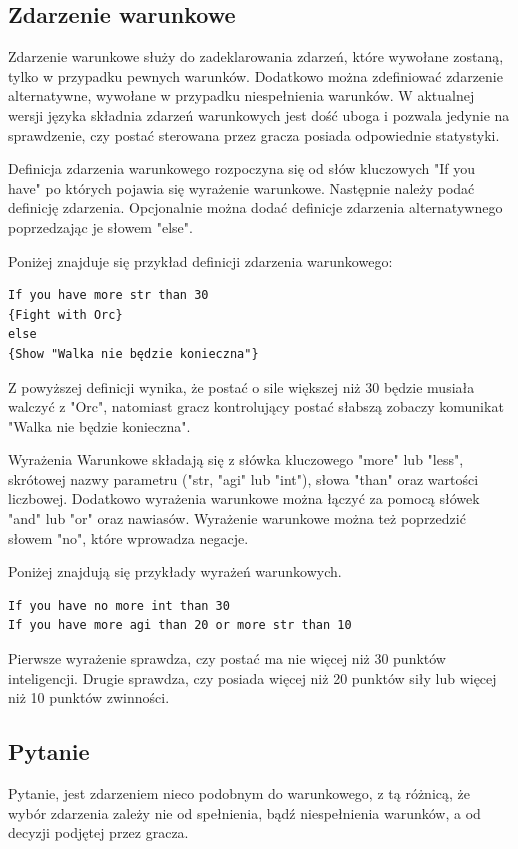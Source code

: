 \documentclass	{xmgr}
\begin{document}
\subsection*{Zdarzenie warunkowe}
Zdarzenie warunkowe służy do zadeklarowania zdarzeń, które wywołane zostaną, tylko w przypadku pewnych warunków. Dodatkowo można zdefiniować zdarzenie alternatywne, wywołane w przypadku niespełnienia warunków.
W aktualnej wersji języka składnia zdarzeń warunkowych jest dość uboga i pozwala jedynie na sprawdzenie, czy postać sterowana przez gracza posiada odpowiednie statystyki.

Definicja zdarzenia warunkowego rozpoczyna się od słów kluczowych "If you have" po których pojawia się wyrażenie warunkowe.
Następnie należy podać definicję zdarzenia. Opcjonalnie można dodać definicje zdarzenia alternatywnego poprzedzając je słowem "else".

Poniżej znajduje się przykład definicji zdarzenia warunkowego: 
\begin{lstlisting}
If you have more str than 30 
{Fight with Orc}
else 
{Show "Walka nie będzie konieczna"}
\end{lstlisting}
Z powyższej definicji wynika, że postać o sile większej niż 30 będzie musiała walczyć z "Orc", natomiast gracz kontrolujący postać słabszą zobaczy komunikat "Walka nie będzie konieczna".

Wyrażenia Warunkowe składają się z słówka kluczowego "more" lub "less", skrótowej nazwy parametru ("str, "agi" lub "int"), słowa "than" oraz wartości liczbowej. Dodatkowo wyrażenia warunkowe można łączyć za pomocą słówek "and" lub "or" oraz nawiasów. Wyrażenie warunkowe można też poprzedzić słowem "no", które wprowadza negacje.

Poniżej znajdują się przykłady wyrażeń warunkowych.

\begin{lstlisting}
If you have no more int than 30
If you have more agi than 20 or more str than 10
\end{lstlisting}
Pierwsze wyrażenie sprawdza, czy postać ma nie więcej niż 30 punktów inteligencji. Drugie sprawdza, czy posiada więcej niż 20 punktów siły lub więcej niż 10 punktów zwinności.

\subsection*{Pytanie}
Pytanie, jest zdarzeniem nieco podobnym do warunkowego, z tą różnicą, że wybór zdarzenia zależy nie od spełnienia, bądź niespełnienia warunków, a od decyzji podjętej przez gracza.
\end{document}
